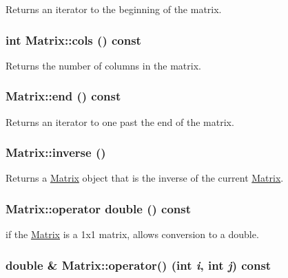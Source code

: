 Returns an iterator to the beginning of the matrix. 

\hypertarget{class_matrix_ac9586a9d7bba127292ce84b1e8ee9cc1}{
\subsubsection[{cols}]{\setlength{\rightskip}{0pt plus 5cm}int Matrix::cols () const}}
\label{class_matrix_ac9586a9d7bba127292ce84b1e8ee9cc1}


Returns the number of columns in the matrix. 

\hypertarget{class_matrix_aa6e886dcd213fdf5c54743f3b8ac7209}{
\subsubsection[{end}]{ Matrix::end () const}}
\label{class_matrix_aa6e886dcd213fdf5c54743f3b8ac7209}


Returns an iterator to one past the end of the matrix. 

\hypertarget{class_matrix_ac4f5e7d4bb1bfd6586bd3384bd2a02b0}{
\subsubsection[{inverse}]{ Matrix::inverse ()}}
\label{class_matrix_ac4f5e7d4bb1bfd6586bd3384bd2a02b0}


Returns a \hyperlink{class_matrix}{Matrix} object that is the inverse of the current \hyperlink{class_matrix}{Matrix}. 

\hypertarget{class_matrix_a94d5e009cbba7556f48a720cff9eedbe}{
\subsubsection[{operator double}]{\setlength{\rightskip}{0pt plus 5cm}Matrix::operator double () const}}
\label{class_matrix_a94d5e009cbba7556f48a720cff9eedbe}


if the \hyperlink{class_matrix}{Matrix} is a 1x1 matrix, allows conversion to a double. 

\hypertarget{class_matrix_a3d361fded5f8992d2202894ca141eb72}{
\subsubsection[{operator()}]{\setlength{\rightskip}{0pt plus 5cm}double \& Matrix::operator() (int {\em i}, \/  int {\em j}) const}}
\label{class_matrix_a3d361fded5f8992d2202894ca141eb72}


